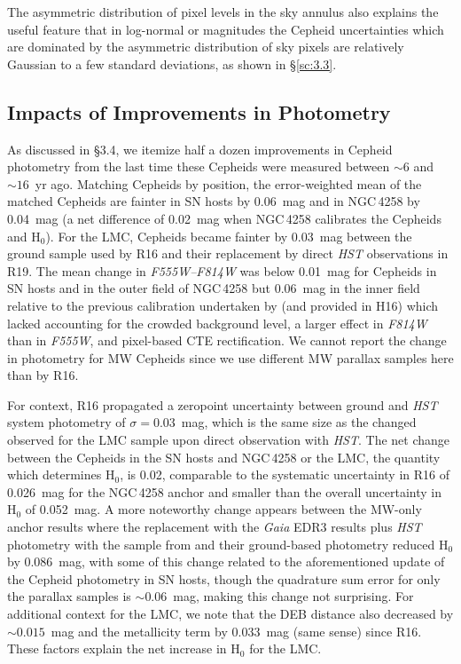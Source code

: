 \documentclass[12pt]{aastex631}
\begin{document}
\begin{appendices}
The asymmetric distribution of pixel levels in the sky annulus also explains the useful feature that in log-normal or magnitudes the Cepheid uncertainties which are dominated by the asymmetric distribution of sky pixels are relatively Gaussian to a few standard deviations, as shown in \S\ref{sc:3.3}.  

\subsection{Impacts of Improvements in Photometry}

As discussed in \S3.4, we itemize half a dozen improvements in Cepheid photometry from the last time these Cepheids were measured between $\sim 6$ and $\sim 16$~yr ago.  Matching Cepheids by position, the error-weighted mean of the matched Cepheids are fainter in SN hosts by 0.06~mag and in NGC$\,$4258 by 0.04~mag (a net difference of 0.02~mag when NGC$\,$4258 calibrates the Cepheids and H$_0$). For the LMC, Cepheids became fainter by 0.03~mag between the ground sample used by R16 and their replacement by direct {\it HST} observations in R19.  The mean change in {\it F555W--F814W} was below 0.01~mag for Cepheids in SN hosts and in the outer field of NGC$\,$4258 but 0.06~mag in the inner field relative to the previous calibration undertaken by \citet{macri06} (and provided in H16) which lacked accounting for the crowded background level, a larger effect in {\it F814W} than in {\it F555W}, and pixel-based CTE rectification.  We cannot report the change in photometry for MW Cepheids since we use different MW parallax samples here than by R16.  

For context, R16 propagated a zeropoint uncertainty between ground and {\it HST} system photometry of $\sigma=0.03$~mag, which is the same size as the changed observed for the LMC sample upon direct observation with {\it HST}.  The net change between the Cepheids in the SN hosts and NGC$\,$4258 or the LMC, the quantity which determines H$_0$, is 0.02, comparable to the systematic uncertainty in R16 of 0.026~mag for the NGC$\,$4258 anchor and smaller than the overall uncertainty in H$_0$ of 0.052~mag.  A more noteworthy change appears between the MW-only anchor results where the replacement with the {\it Gaia} EDR3 results plus {\it HST} photometry with the sample from \citet{benedict07} and their ground-based photometry reduced H$_0$ by 0.086~mag, with some of this change related to the aforementioned update of the Cepheid photometry in SN hosts, though the quadrature sum error for only the parallax samples is $\sim 0.06$~mag, making this change not surprising.  For additional context for the LMC, we note that the DEB distance also decreased by $\sim 0.015$~mag and the metallicity term by 0.033~mag (same sense) since R16.  These factors explain the net increase in H$_0$ for the LMC.   


\end{appendices}
\end{document}
